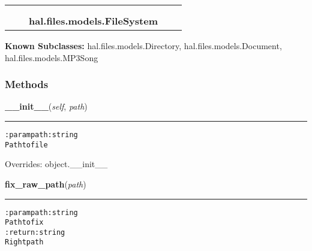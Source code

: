     \label{hal:files:models:FileSystem}
\begin{tabular}{cccccc}
\multicolumn{2}{r}{\settowidth{\BCL}{object}\multirow{2}{\BCL}{object}}
&&
  \\\cline{3-3}
  &&\multicolumn{1}{c|}{}
&&
  \\
&&\multicolumn{2}{l}{\textbf{hal.files.models.FileSystem}}
\end{tabular}

\textbf{Known Subclasses:}
hal.files.models.Directory,
    hal.files.models.Document,
    hal.files.models.MP3Song



  \subsubsection{Methods}

    \vspace{0.5ex}

\hspace{.8\funcindent}\begin{boxedminipage}{\funcwidth}

    \raggedright \textbf{\_\_init\_\_}(\textit{self}, \textit{path})

    \vspace{-1.5ex}

    \rule{\textwidth}{0.5\fboxrule}
\setlength{\parskip}{2ex}
\begin{alltt}

:param path: string
    Path to file
\end{alltt}

\setlength{\parskip}{1ex}
      Overrides: object.\_\_init\_\_

    \end{boxedminipage}

    \label{hal:files:models:FileSystem:fix_raw_path}

    \vspace{0.5ex}

\hspace{.8\funcindent}\begin{boxedminipage}{\funcwidth}

    \raggedright \textbf{fix\_raw\_path}(\textit{path})

    \vspace{-1.5ex}

    \rule{\textwidth}{0.5\fboxrule}
\setlength{\parskip}{2ex}
\begin{alltt}

:param path: string
    Path to fix
:return: string
    Right path
\end{alltt}

\setlength{\parskip}{1ex}
    \end{boxedminipage}

